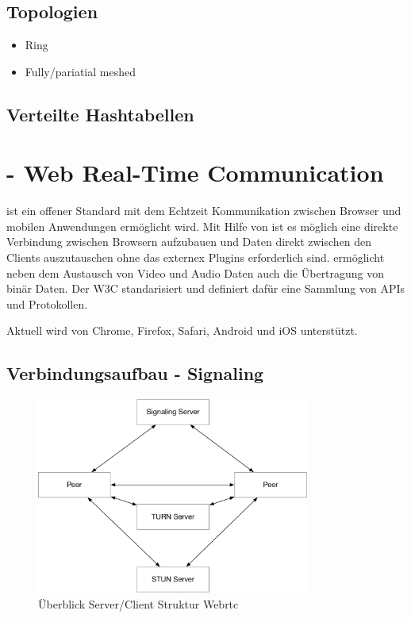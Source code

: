 \subsection{Topologien}
\begin{itemize}
	\item Ring
	\item Fully/pariatial meshed
\end{itemize}
\subsection{Verteilte Hashtabellen}

\section{\webrtc - Web Real-Time Communication}

\webrtc ist ein offener Standard mit dem Echtzeit Kommunikation zwischen Browser und mobilen Anwendungen ermöglicht wird. Mit Hilfe von \webrtc ist es möglich eine direkte Verbindung zwischen Browsern aufzubauen und Daten direkt zwischen den Clients auszutauschen ohne das externex Plugins erforderlich sind. \webrtc ermöglicht neben dem Austausch von Video und Audio Daten auch die Übertragung von binär Daten.\cite{webrtc-book} Der W3C\cite{w3Webrtc} standarisiert \webrtc und definiert dafür eine Sammlung von APIs und Protokollen.

Aktuell wird \webrtc von Chrome, Firefox, Safari, Android und iOS unterstützt.\cite{caniuse-webrtc}

\subsection{Verbindungsaufbau - Signaling}

\begin{figure}[!h]
	\centering
	\includegraphics[width=0.8\textwidth]{figures/Webrtc_overview}
	\caption[A Figure Short-Title]{Überblick Server/Client Struktur Webrtc}
	\label{fig:webrtc_overview}
\end{figure}

